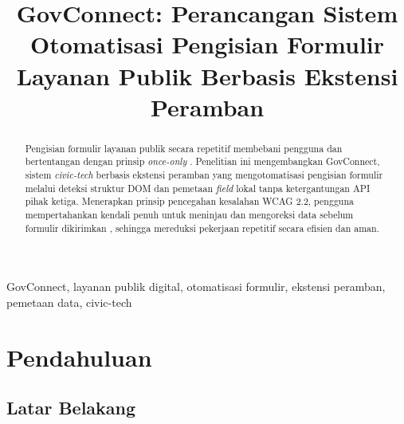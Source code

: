 \documentclass[conference]{IEEEtran}
\begin{document}
\title{GovConnect: Perancangan Sistem Otomatisasi Pengisian Formulir Layanan Publik Berbasis Ekstensi Peramban}

\author{
    \and
}

\maketitle

\begin{abstract}
Pengisian formulir layanan publik secara repetitif membebani pengguna dan bertentangan dengan prinsip \textit{once-only} \cite{OECD2022Principles,OECD2026DGO}. Penelitian ini mengembangkan GovConnect, sistem \textit{civic-tech} berbasis ekstensi peramban yang mengotomatisasi pengisian formulir melalui deteksi struktur DOM dan pemetaan \textit{field} lokal tanpa ketergantungan API pihak ketiga. Menerapkan prinsip pencegahan kesalahan WCAG 2.2, pengguna mempertahankan kendali penuh untuk meninjau dan mengoreksi data sebelum formulir dikirimkan \cite{W3C2023WCAG}, sehingga mereduksi pekerjaan repetitif secara efisien dan aman.
\end{abstract}

\begin{IEEEkeywords}
GovConnect, layanan publik digital, otomatisasi formulir, ekstensi peramban, pemetaan data, civic-tech
\end{IEEEkeywords}

\section{Pendahuluan}

\subsection{Latar Belakang}
\end{document}
